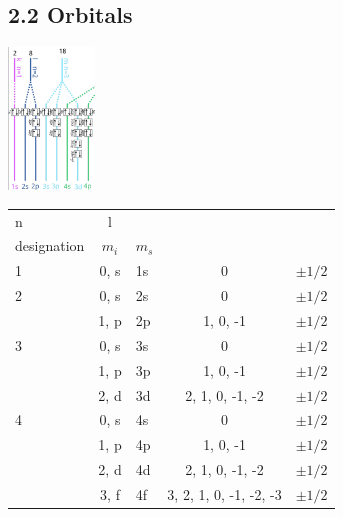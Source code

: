 \subsection{2.2 Orbitals}
  \begin{minipage}{0.99\linewidth}
    \begin{minipage}{0.32\linewidth}
      \includegraphics[width = 2.3cm]{src/2_Atoms/images/Energieniveau.png}
    \end{minipage}
    \begin{minipage}{0.49\linewidth}
      \begin{scriptsize}
        \begin{center}
            \begin{tabular}{|p{0.3mm}|c|p{}|c|c|} 
                \hline
                n & l & \rotatebox{90}{\pbox{2cm}{subshell\\ designation}}    & $m_i$                  & $m_s$ \\ [0.5ex] 
                \hline\hline
                1 & 0, s & 1s                                  & 0                      & $\pm 1/2$ \\ 
                \hline
                2 & 0, s & 2s                                  & 0                      & $\pm 1/2$ \\
                  & 1, p & 2p                                  & 1, 0, -1               & $\pm 1/2$ \\
                \hline
                3 & 0, s & 3s                                  & 0                      & $\pm 1/2$ \\
                  & 1, p & 3p                                  & 1, 0, -1               & $\pm 1/2$ \\
                  & 2, d & 3d                                  & 2, 1, 0, -1, -2        & $\pm 1/2$ \\
                \hline
                4 & 0, s & 4s                                  & 0                      & $\pm 1/2$ \\
                  & 1, p & 4p                                  & 1, 0, -1               & $\pm 1/2$ \\
                  & 2, d & 4d                                  & 2, 1, 0, -1, -2        & $\pm 1/2$ \\
                  & 3, f & 4f                                  & 3, 2, 1, 0, -1, -2, -3 & $\pm 1/2$ \\
                \hline
            \end{tabular}
        \end{center}
        \end{scriptsize}
    \end{minipage}
  \end{minipage}
    
